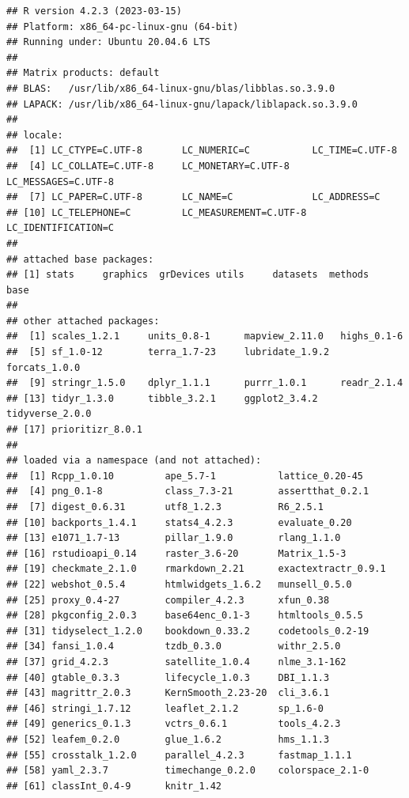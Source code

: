 \documentclass[
  12pt,
]{book}
\begin{document}
\begin{verbatim}
## R version 4.2.3 (2023-03-15)
## Platform: x86_64-pc-linux-gnu (64-bit)
## Running under: Ubuntu 20.04.6 LTS
## 
## Matrix products: default
## BLAS:   /usr/lib/x86_64-linux-gnu/blas/libblas.so.3.9.0
## LAPACK: /usr/lib/x86_64-linux-gnu/lapack/liblapack.so.3.9.0
## 
## locale:
##  [1] LC_CTYPE=C.UTF-8       LC_NUMERIC=C           LC_TIME=C.UTF-8       
##  [4] LC_COLLATE=C.UTF-8     LC_MONETARY=C.UTF-8    LC_MESSAGES=C.UTF-8   
##  [7] LC_PAPER=C.UTF-8       LC_NAME=C              LC_ADDRESS=C          
## [10] LC_TELEPHONE=C         LC_MEASUREMENT=C.UTF-8 LC_IDENTIFICATION=C   
## 
## attached base packages:
## [1] stats     graphics  grDevices utils     datasets  methods   base     
## 
## other attached packages:
##  [1] scales_1.2.1     units_0.8-1      mapview_2.11.0   highs_0.1-6     
##  [5] sf_1.0-12        terra_1.7-23     lubridate_1.9.2  forcats_1.0.0   
##  [9] stringr_1.5.0    dplyr_1.1.1      purrr_1.0.1      readr_2.1.4     
## [13] tidyr_1.3.0      tibble_3.2.1     ggplot2_3.4.2    tidyverse_2.0.0 
## [17] prioritizr_8.0.1
## 
## loaded via a namespace (and not attached):
##  [1] Rcpp_1.0.10         ape_5.7-1           lattice_0.20-45    
##  [4] png_0.1-8           class_7.3-21        assertthat_0.2.1   
##  [7] digest_0.6.31       utf8_1.2.3          R6_2.5.1           
## [10] backports_1.4.1     stats4_4.2.3        evaluate_0.20      
## [13] e1071_1.7-13        pillar_1.9.0        rlang_1.1.0        
## [16] rstudioapi_0.14     raster_3.6-20       Matrix_1.5-3       
## [19] checkmate_2.1.0     rmarkdown_2.21      exactextractr_0.9.1
## [22] webshot_0.5.4       htmlwidgets_1.6.2   munsell_0.5.0      
## [25] proxy_0.4-27        compiler_4.2.3      xfun_0.38          
## [28] pkgconfig_2.0.3     base64enc_0.1-3     htmltools_0.5.5    
## [31] tidyselect_1.2.0    bookdown_0.33.2     codetools_0.2-19   
## [34] fansi_1.0.4         tzdb_0.3.0          withr_2.5.0        
## [37] grid_4.2.3          satellite_1.0.4     nlme_3.1-162       
## [40] gtable_0.3.3        lifecycle_1.0.3     DBI_1.1.3          
## [43] magrittr_2.0.3      KernSmooth_2.23-20  cli_3.6.1          
## [46] stringi_1.7.12      leaflet_2.1.2       sp_1.6-0           
## [49] generics_0.1.3      vctrs_0.6.1         tools_4.2.3        
## [52] leafem_0.2.0        glue_1.6.2          hms_1.1.3          
## [55] crosstalk_1.2.0     parallel_4.2.3      fastmap_1.1.1      
## [58] yaml_2.3.7          timechange_0.2.0    colorspace_2.1-0   
## [61] classInt_0.4-9      knitr_1.42
\end{verbatim}

  
\end{document}
